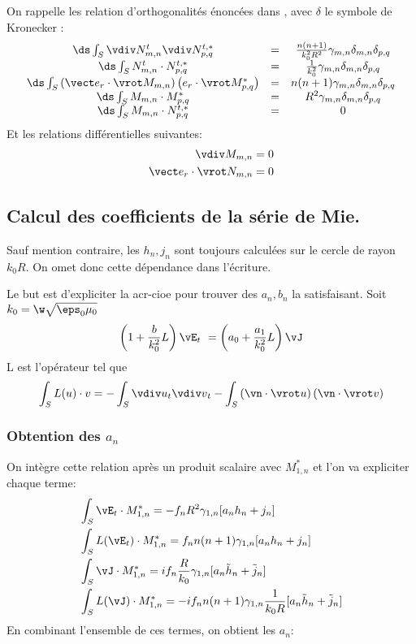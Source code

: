 On rappelle les relation d'orthogonalités énoncées dans \cite{marceaux_high-order_2000}, avec \(\delta\) le symbole de Kronecker :
\[
  \begin{matrix}
    \ds\int_S \vdiv N_{m,n}^t \vdiv N_{p,q}^{t,*} &=& \frac{n(n+1)}{k_0^2 R^2} \gamma_{m,n} \delta_{m,n} \delta_{p,q}\\
    \ds\int_S N_{m,n}^t \cdot N_{p,q}^{t,*} &=& \frac{1}{k_0^2}\gamma_{m,n}\delta_{m,n} \delta_{p,q}\\
    \ds\int_S \left(\vect e_r \cdot \vrot M_{m,n}\right)\left( e_r \cdot \vrot  M_{p,q}^{*}\right) &=& n(n+1) \gamma_{m,n} \delta_{m,n} \delta_{p,q}\\
    \ds\int_S M_{m,n} \cdot M_{p,q}^{*} &=& R^2 \gamma_{m,n} \delta_{m,n} \delta_{p,q}\\
    \ds\int_S M_{m,n} \cdot N_{p,q}^{t,*} &=& 0
  \end{matrix}
\]
Et les relations différentielles suivantes:
\begin{align*}
  \vdiv M_{m,n} &=0 \\
  \vect e_r \cdot \vrot N_{m,n} &= 0
\end{align*}

\subsection{Calcul des coefficients de la série de Mie.}
\begin{tcolorbox}
Sauf mention contraire, les \(h_n,j_n\) sont toujours calculées sur le cercle de rayon \(k_0R\). On omet donc cette dépendance dans l'écriture.
\end{tcolorbox}
Le but est d'expliciter la \gls{acr-cioe} pour trouver des \(a_n, b_n\) la satisfaisant.
Soit \(k_0 = \w\sqrt{\eps_0\mu_0}\)
\begin{equation}
  \label{eq:CIOE} \left(1+\frac{b}{k_0^2}L\right)\vE_t\ = \left(a_0 + \frac{a_1}{k_0^2}L\right)\vJ
\end{equation}
L est l'opérateur tel que
\[
  \int_{S} L(u)\cdot v = - \int_{S} {\vdiv u}_t {\vdiv v}_t - \int_{S}\left(\vn \cdot \vrot u\right)\left( \vn \cdot \vrot v\right)
\]
\subsubsection{Obtention des \(a_n\)}
On intègre cette relation après un produit scalaire avec \(M_{1,n}^{*}\) et l'on va expliciter chaque terme:
\begin{align*}
  &\int_S \vE_t\cdot M_{1,n}^{*} = - f_n R^2 \gamma_{1,n}[a_n h_n + j_n]\\
  &\int_S L(\vE_t)\cdot M_{1,n}^{*} =  f_n n(n+1)\gamma_{1,n}[a_n h_n + j_n]\\
  &\int_S \vJ \cdot M_{1,n}^{*} =  i f_n \frac{R}{k_0} \gamma_{1,n}[a_n \tilde h_n + \tilde j_n]\\
  &\int_S L(\vJ) \cdot M_{1,n}^{*} =  - i f_n n(n+1) \gamma_{1,n}\frac{1}{k_0 R}[a_n \tilde h_n + \tilde j_n]\\
\end{align*}
En combinant l'ensemble de ces termes, on obtient les \(a_n\):


